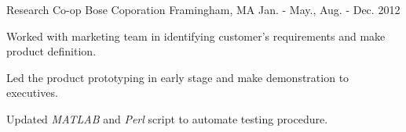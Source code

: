\begin{cventries}
  \cventry
    {Research Co-op} %
    {Bose Coporation} %
    {Framingham, MA} %
    {Jan. - May., Aug. - Dec. 2012} %
    {
      \begin{cvitems} %
        \item {Worked with marketing team in identifying customer's requirements and make product definition.}
        \item {Led the product prototyping in early stage and make demonstration to executives.}
        \item {Updated \textit{MATLAB} and \textit{Perl} script to automate testing procedure.}
      \end{cvitems}
    }

\end{cventries}
